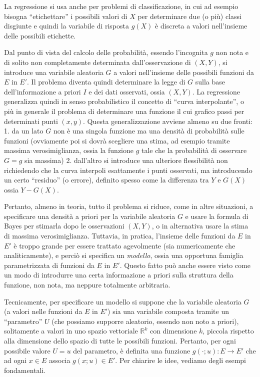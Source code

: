 \documentclass[
  italian,
  letterpaper,
]{book}
\newcommand{\R}{\mathbb{R}}
\theoremstyle{definition}
\theoremstyle{remark}
\begin{document}
La regressione si usa anche per problemi di classificazione, in cui ad
esempio bisogna ``etichettare'' i possibili valori di \(X\) per
determinare due (o più) classi disgiunte e quindi la variabile di
risposta \(g(X)\) è discreta a valori nell'insieme delle possibili
etichette.

Dal punto di vista del calcolo delle probabilità, essendo l'incognita
\(g\) non nota e di solito non completamente determinata
dall'osservazione di \((X,Y)\), si introduce una variabile aleatoria
\(G\) a valori nell'insieme delle possibili funzioni da \(E\) in \(E'\).
Il problema diventa quindi determinare la legge di \(G\) sulla base
dell'informazione a priori \(I\) e dei dati osservati, ossia \((X,Y)\).
La regressione generalizza quindi in senso probabilistico il concetto di
``curva interpolante'', o più in generale il problema di determinare una
funzione il cui grafico passi per determinati punti \((x,y)\). Questa
generalizzazione avviene almeno su due fronti: 1. da un lato \(G\) non è
una singola funzione ma una densità di probabilità sulle funzioni
(ovviamente poi si dovrà scegliere una stima, ad esempio tramite massima
verosimiglianza, ossia la funzione \(g\) tale che la probabilità di
osservare \(G=g\) sia massima) 2. dall'altro si introduce una ulteriore
flessibilità non richiedendo che la curva interpoli esattamente i punti
osservati, ma introducendo un certo ``residuo'' (o errore), definito
spesso come la differenza tra \(Y\) e \(G(X)\) ossia \(Y-G(X)\).

Pertanto, almeno in teoria, tutto il problema si riduce, come in altre
situazioni, a specificare una densità a priori per la variabile
aleatoria \(G\) e usare la formula di Bayes per stimarla dopo le
osservazioni \((X,Y)\), o in alternativa usare la stima di massima
verosimiglianza. Tuttavia, in pratica, l'insieme delle funzioni da \(E\)
in \(E'\) è troppo grande per essere trattato agevolmente (sia
numericamente che analiticamente), e perciò si specifica un
\emph{modello}, ossia una opportuna famiglia parametrizzata di funzioni
da \(E\) in \(E'\). Questo fatto può anche essere visto come un modo di
introdurre una certa informazione a priori sulla struttura della
funzione, non nota, ma neppure totalmente arbitraria.

Tecnicamente, per specificare un modello si suppone che la variabile
aleatoria \(G\) (a valori nelle funzioni da \(E\) in \(E'\)) sia una
variabile composta tramite un ``parametro'' \(U\) (che possiamo supporre
aleatorio, essendo non noto a priori), solitamente a valori in uno
spazio vettoriale \(\R^k\) con dimensione \(k\), piccola rispetto alla
dimensione dello spazio di tutte le possibili funzioni. Pertanto, per
ogni possibile valore \(U=u\) del parametro, è definita una funzione
\(g( \cdot ; u): E \to E'\) che ad ogni \(x \in E\) associa
\(g(x; u) \in E'\). Per chiarire le idee, vediamo degli esempi
fondamentali.
\end{document}
